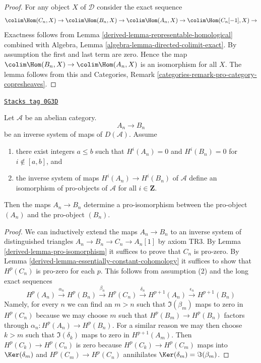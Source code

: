 \begin{proof}

For any object $X$ of $\mathcal{D}$ consider the exact sequence
$$
\colim \Hom(C_n, X) \to
\colim \Hom(B_n, X) \to
\colim \Hom(A_n, X) \to
\colim \Hom(C_n[-1], X) \to
$$
Exactness follows from Lemma \ref{derived-lemma-representable-homological}
combined with
Algebra, Lemma \ref{algebra-lemma-directed-colimit-exact}.
By assumption the first and last term are zero. Hence the map
$\colim \Hom(B_n, X) \to \colim \Hom(A_n, X)$ is an isomorphism
for all $X$. The lemma follows from this and
Categories, Remark \ref{categories-remark-pro-category-copresheaves}.
\end{proof}

\begin{lemma}
\label{derived-lemma-pro-isomorphism-bis}
\href{https://stacks.math.columbia.edu/tag/0G3D}{\texttt{Stacks tag 0G3D}}

Let $\mathcal{A}$ be an abelian category.
$$
A_n \to B_n
$$
be an inverse system of maps of $D(\mathcal{A})$. Assume
\begin{enumerate}
\item there exist integers $a \leq b$ such that $H^i(A_n) = 0$
and $H^i(B_n) = 0$ for $i \not \in [a, b]$, and
\item the inverse system of maps $H^i(A_n) \to H^i(B_n)$ of $\mathcal{A}$
define an isomorphism of pro-objects of $\mathcal{A}$
for all $i \in \mathbf{Z}$.
\end{enumerate}
Then the maps $A_n \to B_n$
determine a pro-isomorphism between the pro-object $(A_n)$
and the pro-object $(B_n)$.
\end{lemma}

\begin{proof}

We can inductively extend the maps $A_n \to B_n$ to an inverse system of
distinguished triangles $A_n \to B_n \to C_n \to A_n[1]$ by
axiom TR3. By Lemma \ref{derived-lemma-pro-isomorphism} it suffices to prove
that $C_n$ is pro-zero. By Lemma \ref{derived-lemma-essentially-constant-cohomology}
it suffices to show that $H^p(C_n)$ is pro-zero for each $p$.
This follows from assumption (2) and the long exact sequences
$$
H^p(A_n) \xrightarrow{\alpha_n} H^p(B_n)
\xrightarrow{\beta_n}
H^p(C_n) \xrightarrow{\delta_n} H^{p + 1}(A_n)
\xrightarrow{\epsilon_n}
H^{p + 1}(B_n)
$$
Namely, for every $n$ we can find an $m > n$ such that
$\Im(\beta_m)$ maps to zero in $H^p(C_n)$ because we may choose
$m$ such that $H^p(B_m) \to H^p(B_n)$ factors through
$\alpha_n : H^p(A_n) \to H^p(B_n)$. For a similar reason we may
then choose $k > m$ such that $\Im(\delta_k)$ maps to zero
in $H^{p + 1}(A_m)$. Then $H^p(C_k) \to H^p(C_n)$ is zero because
$H^p(C_k) \to H^p(C_m)$ maps into $\Ker(\delta_m)$ and $H^p(C_m) \to H^p(C_n)$
annihilates $\Ker(\delta_m) = \Im(\beta_m)$.
\end{proof}



